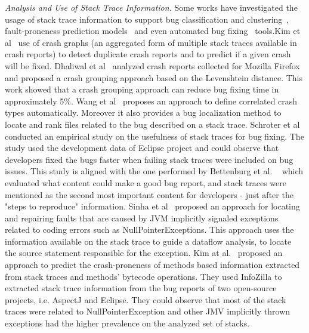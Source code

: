 \documentclass[conference]{IEEEtran}
\begin{document}
\textit{Analysis and Use of Stack Trace Information.} Some works have investigated the usage of stack trace information to support bug classification and clustering~\cite{wang2013improving, kim2011crash, dhaliwal2011classifying}, fault-proneness prediction models~\cite{kim2013predicting} and even automated bug fixing~\cite{sinha2009fault} tools.Kim et al~\cite{kim2011crash} use of crash graphs (an aggregated form of multiple stack traces available in crash reports) to detect duplicate crash reports and to predict if a given crash will be fixed. Dhaliwal et al~\cite{} analyzed crash reports collected for Mozilla Firefox and proposed a crash grouping approach based on the Levenshtein distance. This work showed that a crash grouping approach can reduce bug fixing time in approximately 5\%. Wang et al~\cite{} proposes an approach to define correlated crash types automatically. Moreover it also provides a bug localization method to locate and rank files related to the bug described on a stack trace.
Schroter et al~\cite{schroter2010stack} conducted an empirical study on the usefulness of stack traces for bug fixing. The study used the development data of Eclipse project and could observe that developers fixed the bugs faster when failing stack traces were included on bug issues. This study is aligned with the one performed by Bettenburg et al. ~\cite{bettenburg2008makes} which evaluated what content could make a good bug report, and stack traces were mentioned as the second most important content for developers - just after the "steps to reproduce" information. Sinha et al~\cite{sinha2009fault} proposed an approach for locating and repairing faults that are caused by JVM implicitly signaled exceptions related to coding errors such as NullPointerExceptions. This approach uses the information available on the stack trace to guide a dataflow analysis, to locate the source statement responsible for the exception. Kim at al.~\cite{kim2013predicting} proposed an approach to predict the crash-proneness of methods based information extracted from stack traces and methods' bytecode operations. They used InfoZilla to extracted stack trace information from the bug reports of two open-source projects, i.e. AspectJ and Eclipse. They could observe that most of the stack traces were related to NullPointerException and other JMV implicitly thrown exceptions had the higher prevalence on the analyzed set of stacks.
 
\end{document}
